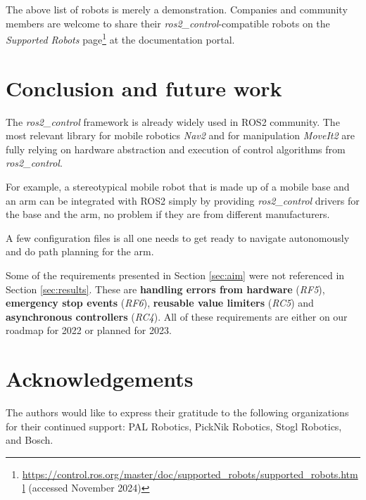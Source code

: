 \documentclass[journal]{IEEEtran}
\begin{document}
The above list of robots is merely a demonstration. Companies and community members are welcome to share their \emph{ros2\_control}-compatible robots on the \emph{Supported Robots} page\footnote{\url{https://control.ros.org/master/doc/supported\_robots/supported\_robots.html} (accessed November 2024)} at the documentation portal.

\section{Conclusion and future work}

The \emph{ros2\_control} framework is already widely used in ROS2 community. The most relevant library for mobile robotics \emph{Nav2} and for manipulation \emph{MoveIt2} are fully relying on hardware abstraction and execution of control algorithms from \emph{ros2\_control}.

For example, a stereotypical mobile robot that is made up of a mobile base and an arm can be integrated with ROS2 simply by providing \emph{ros2\_control} drivers for the base and the arm, no problem if they are from different manufacturers.

A few configuration files is all one needs to get ready to navigate autonomously and do path planning for the arm.

Some of the requirements presented in Section \ref{sec:aim} were not referenced in Section \ref{sec:results}. These are \textbf{handling errors from hardware} (\emph{RF5}), \textbf{emergency stop events} (\emph{RF6}), \textbf{reusable value limiters} (\emph{RC5}) and \textbf{asynchronous controllers} (\emph{RC4}). All of these requirements are either on our roadmap for 2022 or planned for 2023.

\section{Acknowledgements}

The authors would like to express their gratitude to the following organizations for their continued support:
PAL Robotics, PickNik Robotics, Stogl Robotics, and Bosch.
\end{document}
